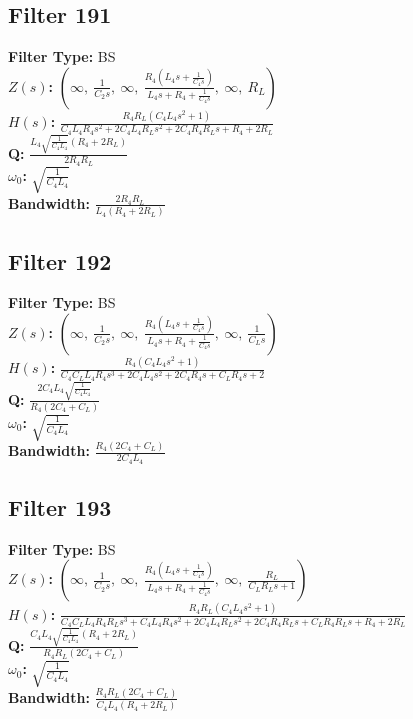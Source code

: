 \documentclass{article}
\begin{document}
\subsection*{Filter 191}
\textbf{Filter Type:} BS \\ 
\textbf{$Z(s)$:} $\left( \infty, \  \frac{1}{C_{2} s}, \  \infty, \  \frac{R_{4} \left(L_{4} s + \frac{1}{C_{4} s}\right)}{L_{4} s + R_{4} + \frac{1}{C_{4} s}}, \  \infty, \  R_{L}\right)$ \\ 
\textbf{$H(s)$:} $\frac{R_{4} R_{L} \left(C_{4} L_{4} s^{2} + 1\right)}{C_{4} L_{4} R_{4} s^{2} + 2 C_{4} L_{4} R_{L} s^{2} + 2 C_{4} R_{4} R_{L} s + R_{4} + 2 R_{L}}$ \\ 
\textbf{Q:} $\frac{L_{4} \sqrt{\frac{1}{C_{4} L_{4}}} \left(R_{4} + 2 R_{L}\right)}{2 R_{4} R_{L}}$ \\ 
\textbf{$\omega_0$:} $\sqrt{\frac{1}{C_{4} L_{4}}}$ \\ 
\textbf{Bandwidth:} $\frac{2 R_{4} R_{L}}{L_{4} \left(R_{4} + 2 R_{L}\right)}$ \\ 
\subsection*{Filter 192}
\textbf{Filter Type:} BS \\ 
\textbf{$Z(s)$:} $\left( \infty, \  \frac{1}{C_{2} s}, \  \infty, \  \frac{R_{4} \left(L_{4} s + \frac{1}{C_{4} s}\right)}{L_{4} s + R_{4} + \frac{1}{C_{4} s}}, \  \infty, \  \frac{1}{C_{L} s}\right)$ \\ 
\textbf{$H(s)$:} $\frac{R_{4} \left(C_{4} L_{4} s^{2} + 1\right)}{C_{4} C_{L} L_{4} R_{4} s^{3} + 2 C_{4} L_{4} s^{2} + 2 C_{4} R_{4} s + C_{L} R_{4} s + 2}$ \\ 
\textbf{Q:} $\frac{2 C_{4} L_{4} \sqrt{\frac{1}{C_{4} L_{4}}}}{R_{4} \left(2 C_{4} + C_{L}\right)}$ \\ 
\textbf{$\omega_0$:} $\sqrt{\frac{1}{C_{4} L_{4}}}$ \\ 
\textbf{Bandwidth:} $\frac{R_{4} \left(2 C_{4} + C_{L}\right)}{2 C_{4} L_{4}}$ \\ 
\subsection*{Filter 193}
\textbf{Filter Type:} BS \\ 
\textbf{$Z(s)$:} $\left( \infty, \  \frac{1}{C_{2} s}, \  \infty, \  \frac{R_{4} \left(L_{4} s + \frac{1}{C_{4} s}\right)}{L_{4} s + R_{4} + \frac{1}{C_{4} s}}, \  \infty, \  \frac{R_{L}}{C_{L} R_{L} s + 1}\right)$ \\ 
\textbf{$H(s)$:} $\frac{R_{4} R_{L} \left(C_{4} L_{4} s^{2} + 1\right)}{C_{4} C_{L} L_{4} R_{4} R_{L} s^{3} + C_{4} L_{4} R_{4} s^{2} + 2 C_{4} L_{4} R_{L} s^{2} + 2 C_{4} R_{4} R_{L} s + C_{L} R_{4} R_{L} s + R_{4} + 2 R_{L}}$ \\ 
\textbf{Q:} $\frac{C_{4} L_{4} \sqrt{\frac{1}{C_{4} L_{4}}} \left(R_{4} + 2 R_{L}\right)}{R_{4} R_{L} \left(2 C_{4} + C_{L}\right)}$ \\ 
\textbf{$\omega_0$:} $\sqrt{\frac{1}{C_{4} L_{4}}}$ \\ 
\textbf{Bandwidth:} $\frac{R_{4} R_{L} \left(2 C_{4} + C_{L}\right)}{C_{4} L_{4} \left(R_{4} + 2 R_{L}\right)}$ \\ 
\end{document}
